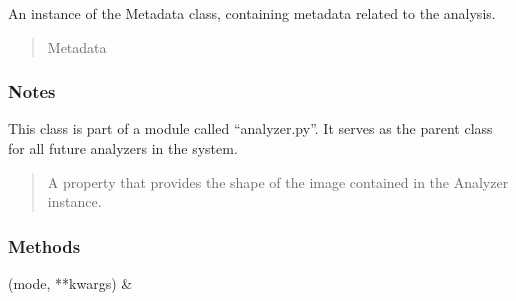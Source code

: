 \documentclass[letterpaper,10pt,english]{sphinxmanual}
\begin{document}
\begin{fulllineitems}
\begin{fulllineitems}
\begin{quote}
\begin{description}
\end{description}\end{quote}

\end{fulllineitems}


\begin{fulllineitems}
\label{\detokenize{forensicfit.core.analyzer:forensicfit.core.analyzer.Analyzer.metadata}}
\pysigstartsignatures
{}
\pysigstopsignatures
\sphinxAtStartPar
An instance of the Metadata class, containing metadata related to the
analysis.
\begin{quote}\begin{description}
\sphinxAtStartPar
Metadata

\end{description}\end{quote}

\end{fulllineitems}

\subsubsection*{Notes}

\sphinxAtStartPar
This class is part of a module called “analyzer.py”. It serves as the
parent class for all future analyzers in the system.
\begin{quote}\begin{description}
\begin{description}
\sphinxAtStartPar
A property that provides the shape of the image contained in the Analyzer instance.

\end{description}

\end{description}\end{quote}
\subsubsection*{Methods}


\begin{savenotes}\sphinxattablestart
\sphinxthistablewithglobalstyle
\sphinxthistablewithnovlinesstyle
\centering
\begin{tabulary}{\linewidth}[t]{}
\sphinxtoprule
\sphinxtableatstartofbodyhook
\sphinxAtStartPar
{\hyperref[\detokenize{forensicfit.core.analyzer:forensicfit.core.analyzer.Analyzer.apply_filter}]{}}(mode, **kwargs)
&
\sphinxAtStartPar


\end{tabulary}
\end{savenotes}
\end{fulllineitems}
\end{document}
